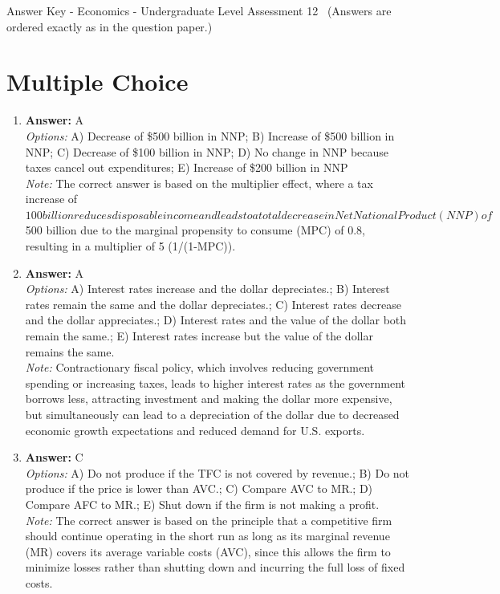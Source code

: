 \documentclass[12pt]{article}
\begin{document}
\begin{center}
Answer Key - Economics - Undergraduate Level Assessment 12 \
\small (Answers are ordered exactly as in the question paper.)
\end{center}

\section*{Multiple Choice}
\begin{enumerate}[label=\arabic*.]
\item \textbf{Answer:} A
\\ \textit{Options:} A) Decrease of \$500 billion in NNP; B) Increase of \$500 billion in NNP; C) Decrease of \$100 billion in NNP; D) No change in NNP because taxes cancel out expenditures; E) Increase of \$200 billion in NNP
\\ \textit{Note:} The correct answer is based on the multiplier effect, where a tax increase of $100 billion reduces disposable income and leads to a total decrease in Net National Product (NNP) of $500 billion due to the marginal propensity to consume (MPC) of 0.8, resulting in a multiplier of 5 (1/(1-MPC)).
\item \textbf{Answer:} A
\\ \textit{Options:} A) Interest rates increase and the dollar depreciates.; B) Interest rates remain the same and the dollar depreciates.; C) Interest rates decrease and the dollar appreciates.; D) Interest rates and the value of the dollar both remain the same.; E) Interest rates increase but the value of the dollar remains the same.
\\ \textit{Note:} Contractionary fiscal policy, which involves reducing government spending or increasing taxes, leads to higher interest rates as the government borrows less, attracting investment and making the dollar more expensive, but simultaneously can lead to a depreciation of the dollar due to decreased economic growth expectations and reduced demand for U.S. exports.
\item \textbf{Answer:} C
\\ \textit{Options:} A) Do not produce if the TFC is not covered by revenue.; B) Do not produce if the price is lower than AVC.; C) Compare AVC to MR.; D) Compare AFC to MR.; E) Shut down if the firm is not making a profit.
\\ \textit{Note:} The correct answer is based on the principle that a competitive firm should continue operating in the short run as long as its marginal revenue (MR) covers its average variable costs (AVC), since this allows the firm to minimize losses rather than shutting down and incurring the full loss of fixed costs.

\end{enumerate}
\end{document}
